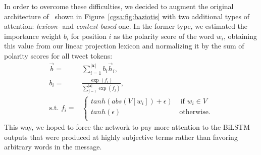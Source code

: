 In order to overcome these difficulties, we decided to augment the
original architecture of~\citet{Baziotis:17} shown in
Figure~\ref{cgsa:fig:baziotis} with two additional types of attention:
\emph{lexicon-} and \emph{context-based} one.  In the former type, we
estimated the importance weight $b_i$ for position $i$ as the polarity
score of the word $w_i$, obtaining this value from our linear
projection lexicon and normalizing it by the sum of polarity scores
for all tweet tokens:
\begin{align*}
  \vec{b} =& \sum_{i=1}^{|\mathbf{x}|}b_i\vec{h}_i,\\
  b_i =& \frac{\exp(f_i)}{\sum_{j=1}^{|\mathbf{x}|}\exp(f_j)},\\
  \mbox{s.t. }f_i
  =& \left\{
  \begin{array}{ll}
    tanh(abs(V[{w_i}]) + \epsilon) & \textrm{ if } w_i\in V\\
    tanh(\epsilon) & \, \textrm{otherwise.} \\
  \end{array}
  \right .
\end{align*}\label{cgsa:eq:lba}%
This way, we hoped to force the network to pay more attention to the
BiLSTM outputs that were produced at highly subjective terms rather
than favoring arbitrary words in the message.

